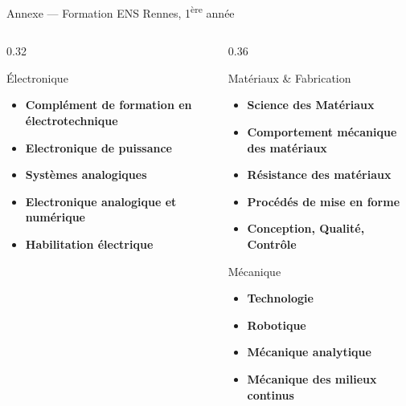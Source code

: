 \documentclass[aspectratio=169]{beamer}
\begin{document}
	\begin{frame}[t,shrink=8]{Annexe — Formation ENS Rennes, 1\textsuperscript{ère} année}
		\begin{columns}[T]
			\begin{column}{0.32\textwidth}
				\begin{block}{Électronique}
					\tiny\begin{itemize}\setlength\itemsep{1pt}\setlength\parsep{0pt}
						\item \textbf{Complément de formation en électrotechnique}
						\item \textbf{Electronique de puissance}
						\item \textbf{Systèmes analogiques}
						\item \textbf{Electronique analogique et numérique}
						\item \textbf{Habilitation électrique}
					\end{itemize}
				\end{block}
			\end{column}
			\begin{column}{0.36\textwidth}
				\begin{block}{Matériaux \& Fabrication}
					\tiny\begin{itemize}\setlength\itemsep{1pt}\setlength\parsep{0pt}
						\item \textbf{Science des Matériaux}
						\item \textbf{Comportement mécanique des matériaux}
						\item \textbf{Résistance des matériaux}
						\item \textbf{Procédés de mise en forme}
						\item \textbf{Conception, Qualité, Contrôle}
					\end{itemize}
				\end{block}
				\vspace{0.2em}
				\begin{block}{Mécanique}
					\tiny\begin{itemize}\setlength\itemsep{1pt}\setlength\parsep{0pt}
						\item \textbf{Technologie}
						\item \textbf{Robotique}
						\item \textbf{Mécanique analytique}
						\item \textbf{Mécanique des milieux continus}

\end{itemize}
\end{block}
\end{column}
\end{columns}
\end{frame}
\end{document}
